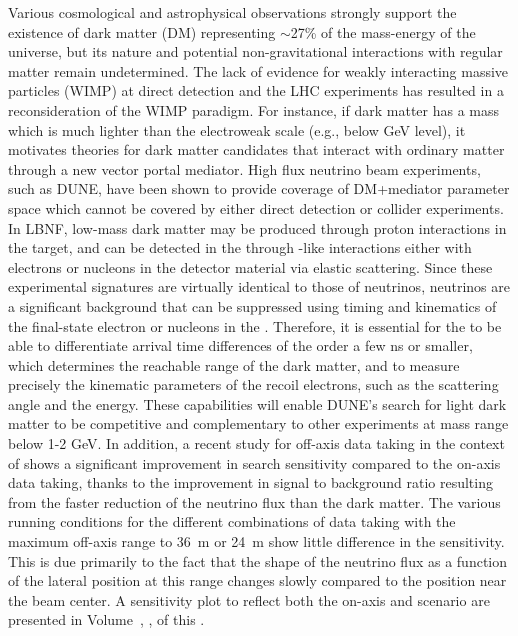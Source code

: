 Various cosmological and astrophysical observations strongly support the existence of dark matter (DM) representing $\sim$27\% of the mass-energy of the universe, but its nature and potential non-gravitational interactions with regular matter remain undetermined. The lack of evidence for weakly interacting massive particles (WIMP) at direct detection and the LHC experiments has resulted in a reconsideration of the WIMP paradigm. For instance, if dark matter has a mass which is much lighter than the electroweak scale (e.g., below GeV level), it motivates theories for dark matter candidates that interact with ordinary matter through a new vector portal mediator. High flux neutrino beam experiments, such as DUNE, have been shown to provide coverage of DM+mediator parameter space which cannot be covered by either direct detection or collider experiments. 
In LBNF, low-mass dark matter may be produced through proton interactions in the target, and can be detected in the  through -like interactions either with electrons or nucleons in the detector material via elastic scattering.  Since these experimental signatures are virtually identical to those of neutrinos, neutrinos are a significant background that can be suppressed using timing and kinematics of the final-state electron or nucleons in the . Therefore, it is essential for the  to be able to differentiate arrival time differences of the order a few ns or smaller, which determines the reachable range of the dark matter, and to measure precisely the kinematic parameters of the recoil electrons, such as the scattering angle and the energy.  These capabilities will enable DUNE's search for light dark matter to be competitive and complementary to other experiments at mass range below 1-2 GeV.
In addition, a recent study for off-axis data taking in the context of  \cite{DeRomeri:2019kic} shows a significant improvement in search sensitivity compared to the on-axis data taking, thanks to the improvement in signal to background ratio resulting from the faster reduction of the neutrino flux than the dark matter. The various running conditions for the different combinations of data taking with the maximum off-axis range to 36~m or 24~m show little difference in the sensitivity. This is due primarily to the fact that the shape of the neutrino flux as a function of the lateral position at this range changes slowly compared to the position near the beam center. A sensitivity plot to reflect both the on-axis and  scenario are presented in Volume~\volnumberphysics, \voltitlephysics{}, of this .

